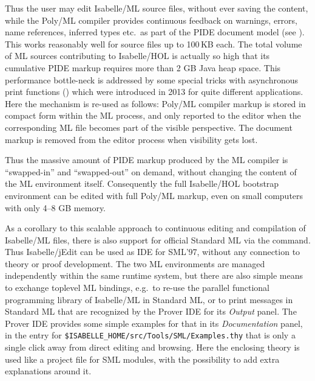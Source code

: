 \begin{isabellebody}
\begin{isamarkuptext}
Thus the user may edit Isabelle/ML source files, without ever saving the
content, while the Poly/ML compiler provides continuous feedback on
warnings, errors, name references, inferred types etc.\ as part of the PIDE
document model (see ). This works reasonably well for source
files up to 100\,KB each. The total volume of ML sources contributing to
Isabelle/HOL is actually so high that its cumulative PIDE markup requires
more than 2 GB Java heap space. This performance bottle-neck is addressed by
some special tricks with asynchronous print functions
() which were introduced in 2013 for quite different
applications. Here the mechanism is re-used as follows: Poly/ML compiler
markup is stored in compact form within the ML process, and only reported to
the editor when the corresponding ML file becomes part of the visible
perspective. The document markup is removed from the editor process when
visibility gets lost.

Thus the massive amount of PIDE markup produced by the ML compiler is
``swapped-in'' and ``swapped-out'' on demand, without changing the content
of the ML environment itself. Consequently the full Isabelle/HOL bootstrap
environment can be edited with full Poly/ML markup, even on small computers
with only 4--8 GB memory.

\medskip As a corollary to this scalable approach to continuous editing and
compilation of Isabelle/ML files, there is also support for official
Standard ML via the \hyperlink{command.SML-file}{\mbox{}} command. Thus Isabelle/jEdit can be
used as IDE for SML'97, without any connection to theory or proof
development. The two ML environments are managed independently within the
same runtime system, but there are also simple means to exchange toplevel ML
bindings, e.g.\ to re-use the parallel functional programming library of
Isabelle/ML in Standard ML, or to print messages in Standard ML that are
recognized by the Prover IDE for its \emph{Output} panel. The Prover IDE
provides some simple examples for that in its \emph{Documentation} panel, in
the entry for \verb|$ISABELLE_HOME|\verb|/|\discretionary{}{}{}\verb|src|\verb|/|\discretionary{}{}{}\verb|Tools|\verb|/|\discretionary{}{}{}\verb|SML|\verb|/|\discretionary{}{}{}\verb|Examples.thy| that is
only a single click away from direct editing and browsing. Here the
enclosing theory is used like a project file for SML modules, with the
possibility to add extra explanations around it.


\end{isamarkuptext}
\end{isabellebody}
